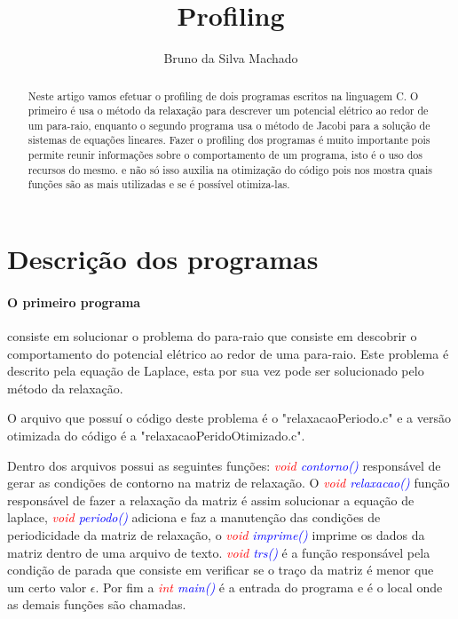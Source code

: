 \documentclass[]{article}
\title{Profiling}
\author{Bruno da Silva Machado}
\begin{document}
\maketitle

\begin{abstract}

Neste artigo vamos efetuar o profiling de dois programas escritos na linguagem C. O primeiro é usa o método da relaxação para descrever um potencial elétrico ao redor de um para-raio, enquanto o segundo programa usa o método de Jacobi para a solução de sistemas de equações lineares. Fazer o profiling dos programas é muito importante pois permite reunir informações sobre o comportamento de um programa, isto é o uso dos recursos do mesmo. e não só isso auxilia na otimização do código pois nos mostra quais funções são as mais utilizadas e se é possível otimiza-las.

\end{abstract}

\section{Descrição dos programas}

\paragraph{O primeiro programa} consiste em solucionar o problema do para-raio que consiste em descobrir o comportamento do potencial elétrico ao redor de uma para-raio. Este problema é descrito pela equação de Laplace, esta por sua vez pode ser solucionado pelo método da relaxação. 

O arquivo que possuí o código deste problema é o "relaxacaoPeriodo.c" e a versão otimizada do código é a  "relaxacaoPeridoOtimizado.c". 

Dentro dos arquivos possui as seguintes funções: \textit{\textcolor{red}{void} \textcolor{blue}{contorno()}} responsável de gerar as condições de contorno na matriz de relaxação. O \textit{\textcolor{red}{void} \textcolor{blue}{relaxacao()}} função responsável de fazer a relaxação da matriz é assim solucionar a equação de laplace, \textit{\textcolor{red}{void} \textcolor{blue}{periodo()}} adiciona e faz a manutenção das condições de periodicidade da matriz de relaxação, o \textit{\textcolor{red}{void} \textcolor{blue}{imprime()}} imprime os dados da matriz dentro de uma arquivo de texto. \textit{\textcolor{red}{void} \textcolor{blue}{trs()}} é a função responsável pela condição de parada que consiste em verificar se o traço da matriz é menor que um certo valor $\epsilon$. Por fim a \textit{\textcolor{red}{int} \textcolor{blue}{main()}} é a entrada do programa e é o local onde as demais funções são chamadas.
\end{document}
